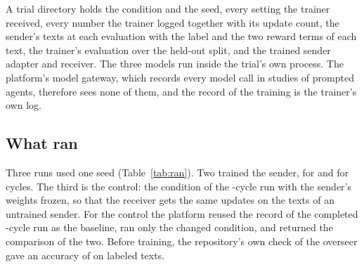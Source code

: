 \documentclass[11pt,a4paper]{article}
\begin{document}
A trial directory holds the condition and the seed, every setting the trainer received, every number the
trainer logged together with its update count, the sender's texts at each evaluation with the label and the
two reward terms of each text, the trainer's evaluation over the held-out split, and the trained sender
adapter and receiver. The three models run inside the trial's own process. The platform's model gateway,
which records every model call in studies of prompted agents, therefore sees none of them, and the record
of the training is the trainer's own log.

\subsection{What ran}

Three runs used one seed (Table~\ref{tab:ran}). Two trained the sender, for \ShortCycles{} and for
\LongCycles{} cycles. The third is the control: the condition of the \LongCycles{}-cycle run with the
sender's weights frozen, so that the receiver gets the same \ControlReceiverUpdates{} updates on the texts
of an untrained sender. For the control the platform reused the record of the completed \LongCycles{}-cycle
run as the baseline, ran only the changed condition, and returned the comparison of the two. Before
training, the repository's own check of the overseer gave an accuracy of \OverseerCheckAccuracy{} on
\OverseerCheckTexts{} labeled texts.
\end{document}
